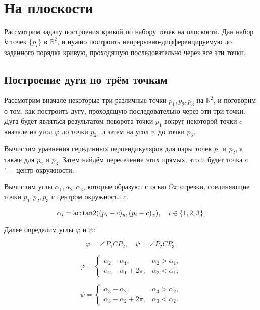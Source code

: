 \section{На плоскости}

Рассмотрим задачу построения кривой по набору точек на плоскости. Дан набор $k$ точек $\{p_i\}$ в $\mathbb{R}^2$, и
нужно построить непрерывно-дифференцируемую до заданного порядка кривую, проходящую последовательно через все эти
точки.

\subsection*{Построение дуги по трём точкам}

Рассмотрим вначале некоторые три различные точки $p_1, p_2, p_3$ на $\mathbb{R}^2$, и поговорим о том, как построить
дугу, проходящую последовательно через эти три точки. Дуга будет являться результатом поворота точки $p_1$ вокруг
некоторой точки $c$ вначале на угол $\varphi$ до точки $p_2$, и затем на угол $\psi$ до точки $p_3$.

Вычислим уравнения серединных перпендикуляров для пары точек $p_1$ и $p_2$, а также для $p_2$ и $p_3$. Затем найдём
пересечение этих прямых, это и будет точка $c$ "--- центр окружности.

Вычислим углы $\alpha_1,\alpha_2,\alpha_3$, которые образуют с осью $Ox$ отрезки, соединяющие точки $p_1, p_2, p_3$ с
центром окружности $c$.

$$
\alpha_i=\operatorname{arctan2}((p_i-c)_y,(p_i-c)_x), \quad i \in \{1,2,3\}.
$$

Далее определим углы $\varphi$ и $\psi$:

$$
\varphi=\angle P_1CP_2, \quad \psi=\angle P_2CP_3.
$$

\begin{equation}
\varphi=
  \begin{cases}
    \alpha_2-\alpha_1,      & \alpha_2>\alpha_1, \\
    \alpha_2-\alpha_1+2\pi, & \alpha_2<\alpha_1;
  \end{cases}
  \label{plane-phi}
\end{equation}

\begin{equation}
\psi=
  \begin{cases}
    \alpha_3-\alpha_2,      & \alpha_3>\alpha_2, \\
    \alpha_3-\alpha_2+2\pi, & \alpha_3<\alpha_2.
  \end{cases}
  \label{plane-psi}
\end{equation}

